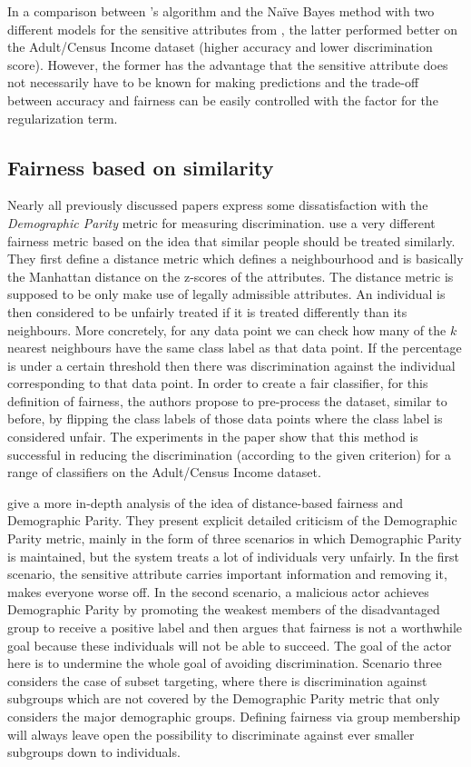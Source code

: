 In a comparison between \citet{kamishima2012fairness}'s algorithm
and the Na\"ive Bayes method with two different models for the sensitive attributes from \citet{calders2010three},
the latter performed better on the Adult/Census Income dataset
(higher accuracy and lower discrimination score).
However, the former has the advantage
that the sensitive attribute does not necessarily have to be known for making predictions
and the trade-off between accuracy and fairness can be easily controlled
with the factor for the regularization term.

\subsection{Fairness based on similarity}%
\label{fairness-based-on-similarity}
Nearly all previously discussed papers express some dissatisfaction
with the \emph{Demographic Parity} metric for measuring discrimination.
\citet{luong2011k} use a very different fairness metric
based on the idea that similar people should be treated similarly.
They first define a distance metric which defines a neighbourhood
and is basically the Manhattan distance on the z-scores of the attributes.
The distance metric is supposed to be only make use of legally admissible attributes.
An individual is then considered to be unfairly treated
if it is treated differently than its neighbours.
More concretely, for any data point we can check
how many of the \(k\) nearest neighbours have the same class label as that data point.
If the percentage is under a certain threshold
then there was discrimination against the individual corresponding to that data point.
In order to create a fair classifier, for this definition of fairness,
the authors propose to pre-process the dataset,
similar to \citet{kamiran2009classifying} before,
by flipping the class labels of those data points where the class label is considered unfair.
The experiments in the paper show that this method is successful in reducing the discrimination
(according to the given criterion)
for a range of classifiers on the Adult/Census Income dataset.

\citet{dwork2012fairness} give a more in-depth analysis
of the idea of distance-based fairness and Demographic Parity.
They present explicit detailed criticism of the Demographic Parity metric,
mainly in the form of three scenarios in which Demographic Parity is maintained,
but the system treats a lot of individuals very unfairly.
In the first scenario, the sensitive attribute carries important information
and removing it, makes everyone worse off.
In the second scenario, a malicious actor achieves Demographic Parity
by promoting the weakest members of the disadvantaged group to receive a positive label
and then argues that fairness is not a worthwhile goal
because these individuals will not be able to succeed.
The goal of the actor here is to undermine the whole goal of avoiding discrimination.
Scenario three considers the case of subset targeting,
where there is discrimination against subgroups
which are not covered by the Demographic Parity metric
that only considers the major demographic groups.
Defining fairness via group membership will always leave open the possibility
to discriminate against ever smaller subgroups down to individuals.

